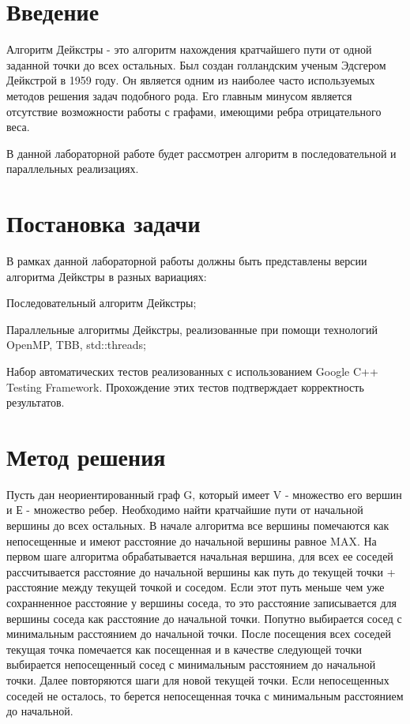 \documentclass{report}
\begin{document}
\setcounter{page}{2}

\tableofcontents
\newpage

\section*{Введение}
Алгоритм Дейкстры - это алгоритм нахождения кратчайшего пути от одной заданной точки до всех остальных. Был создан голландским ученым Эдсгером Дейкстрой в 1959 году. Он является одним из наиболее часто используемых методов решения задач подобного рода. Его главным минусом является отсутствие возможности работы с графами, имеющими ребра отрицательного веса.
\par В данной лабораторной работе будет рассмотрен алгоритм в последовательной и параллельных реализациях.

\newpage

\section*{Постановка задачи}
В рамках данной лабораторной работы должны быть представлены версии алгоритма Дейкстры в разных вариациях:
\begin{itemize}
\item Последовательный алгоритм Дейкстры;
\item Параллельные алгоритмы Дейкстры, реализованные при помощи технологий OpenMP, TBB, std::threads;
\begin{sloppypar}
\item Набор автоматических тестов реализованных с использованием Google C++ Testing Framework. Прохождение этих тестов подтверждает корректность результатов.
\end{sloppypar}
\end{itemize}

\newpage

\section*{Метод решения}
Пусть дан неориентированный граф G, который имеет V - множество его вершин и Е - множество ребер. Необходимо найти кратчайшие пути от начальной вершины до всех остальных. В начале алгоритма все вершины помечаются как непосещенные и имеют расстояние до начальной вершины равное MAX. На первом шаге алгоритма обрабатывается начальная вершина, для всех ее соседей рассчитывается расстояние до начальной вершины как путь до текущей точки + расстояние между текущей точкой и соседом. Если этот путь меньше чем уже сохранненное расстояние у вершины соседа, то  это расстояние записывается для вершины соседа как расстояние до начальной точки. Попутно выбирается сосед с минимальным расстоянием до начальной точки. После посещения всех соседей текущая точка помечается как посещенная и в качестве следующей точки выбирается непосещенный сосед с минимальным расстоянием до начальной точки. Далее повторяются шаги для новой текущей точки. Если непосещенных соседей не осталось, то берется непосещенная точка с минимальным расстоянием до начальной.
\newpage
\end{document}
